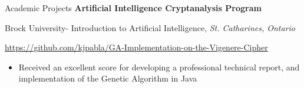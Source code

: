 \begin{rubric}{Academic Projects}
\entry*[November 2019] \textbf{Artificial Intelligence Cryptanalysis Program}
\par{Brock University- Introduction to Artificial Intelligence, \emph{St. Catharines, Ontario}}
%
\par{\faGithub}{  \url{https://github.com/kjpabla/GA-Implementation-on-the-Vigenere-Cipher}}
\begin{itemize}\vspace{-2mm}
 \item Received an excellent score for developing a professional technical report, and implementation of the Genetic Algorithm in Java
\end{itemize}
\end{rubric}